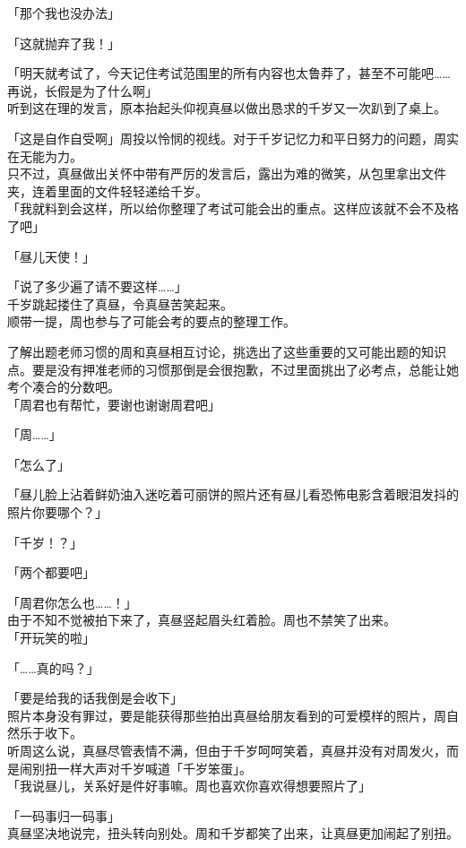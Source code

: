 「那个我也没办法」

「这就抛弃了我！」

「明天就考试了，今天记住考试范围里的所有内容也太鲁莽了，甚至不可能吧……再说，长假是为了什么啊」\\

听到这在理的发言，原本抬起头仰视真昼以做出恳求的千岁又一次趴到了桌上。

「这是自作自受啊」周投以怜悯的视线。对于千岁记忆力和平日努力的问题，周实在无能为力。\\

只不过，真昼做出关怀中带有严厉的发言后，露出为难的微笑，从包里拿出文件夹，连着里面的文件轻轻递给千岁。\\

「我就料到会这样，所以给你整理了考试可能会出的重点。这样应该就不会不及格了吧」

「昼儿天使！」

「说了多少遍了请不要这样……」\\

千岁跳起搂住了真昼，令真昼苦笑起来。\\

顺带一提，周也参与了可能会考的要点的整理工作。

了解出题老师习惯的周和真昼相互讨论，挑选出了这些重要的又可能出题的知识点。要是没有押准老师的习惯那倒是会很抱歉，不过里面挑出了必考点，总能让她考个凑合的分数吧。\\

「周君也有帮忙，要谢也谢谢周君吧」

「周……」

「怎么了」

「昼儿脸上沾着鲜奶油入迷吃着可丽饼的照片还有昼儿看恐怖电影含着眼泪发抖的照片你要哪个？」

「千岁！？」

「两个都要吧」

「周君你怎么也……！」\\

由于不知不觉被拍下来了，真昼竖起眉头红着脸。周也不禁笑了出来。\\

「开玩笑的啦」

「……真的吗？」

「要是给我的话我倒是会收下」\\

照片本身没有罪过，要是能获得那些拍出真昼给朋友看到的可爱模样的照片，周自然乐于收下。\\

听周这么说，真昼尽管表情不满，但由于千岁呵呵笑着，真昼并没有对周发火，而是闹别扭一样大声对千岁喊道「千岁笨蛋」。\\

「我说昼儿，关系好是件好事嘛。周也喜欢你喜欢得想要照片了」

「一码事归一码事」\\

真昼坚决地说完，扭头转向别处。周和千岁都笑了出来，让真昼更加闹起了别扭。

